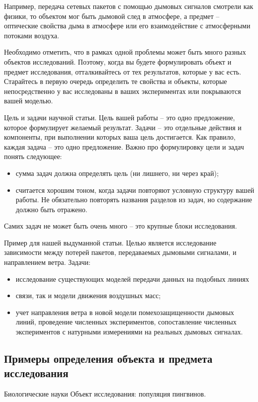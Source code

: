 \documentclass{report}
\begin{document}
Например, передача сетевых пакетов с помощью дымовых сигналов смотрели как физики, то объектом мог быть дымовой след в атмосфере, а предмет -- оптические свойства дыма в атмосфере или его взаимодействие с атмосферными потоками воздуха.

Необходимо отметить, что в рамках одной проблемы может быть много разных объектов исследований. Поэтому, когда вы будете формулировать объект и предмет исследования, отталкивайтесь от тех результатов, которые у вас есть. Старайтесь в первую очередь определить те свойства и объекты, которые непосредственно у вас исследованы в ваших экспериментах или покрываются вашей моделью.

Цель и задачи научной статьи. Цель вашей работы – это одно предложение, которое формулирует желаемый результат. Задачи – это отдельные действия и компоненты, при выполнении которых ваша цель достигается. Как правило, каждая задача – это одно предложение. Важно про формулировку цели и задач понять следующее:

\begin{itemize}
	\item сумма задач должна определять цель (ни лишнего, ни через край);
	\item считается хорошим тоном, когда задачи повторяют условную структуру вашей работы. Не обязательно повторять названия разделов из задач, но    содержание должно быть отражено.
\end{itemize}

Самих задач не может быть очень много – это крупные блоки исследования.

Пример для нашей выдуманной статьи. Целью является исследование зависимости между потерей пакетов, передаваемых дымовыми сигналами, и направлением ветра. Задачи:

\begin{itemize}
	\item исследование существующих моделей передачи данных на подобных линиях
	\item связи, так и модели движения воздушных масс;
	\item учет направления ветра в новой модели помехозащищенности дымовых линий, проведение численных экспериментов, сопоставление численных экспериментов с натурными измерениями на реальных дымовых сигналах.
\end{itemize}

\subsection{Примеры определения объекта и предмета исследования}
Биологические науки
Объект исследования: популяция пингвинов.
\end{document}
